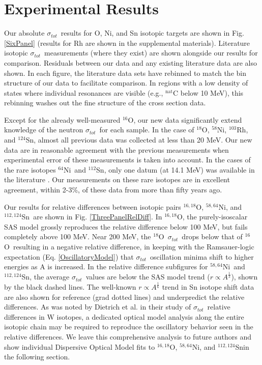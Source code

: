 \documentclass[twocolumn,secnumarabic,amssymb, nobibnotes, aps, prl,
superscriptaddress, nobalancelastpage]{revtex4}
\newcommand{\tot}{\ensuremath{\sigma_{tot}}}
\newcommand{\oSix}{\ensuremath{^{16}}O}
\newcommand{\oEight}{\ensuremath{^{18}}O}
\newcommand{\oSixEight}{\ensuremath{^{16,18}}O}
\newcommand{\niEight}{\ensuremath{^{58}}N\lowercase{i}}
\newcommand{\niFour}{\ensuremath{^{64}}N\lowercase{i}}
\newcommand{\niEightFour}{\ensuremath{^{58,64}}N\lowercase{i}}
\newcommand{\rhThree}{\ensuremath{^{103}}R\lowercase{h}}
\newcommand{\snTwelve}{\ensuremath{^{112}}S\lowercase{n}}
\newcommand{\snFour}{\ensuremath{^{124}}S\lowercase{n}}
\newcommand{\snTwelveFour}{\ensuremath{^{112,124}}S\lowercase{n}}
\begin{document}
\section{Experimental Results}

Our absolute \tot\ results for O, Ni, and Sn isotopic targets are shown in Fig.
\ref{SixPanel} (results for Rh are shown in the supplemental materials).
Literature isotopic \tot\ measurements
(where they exist) are shown alongside our results for comparison.
Residuals between our data and any existing literature data are also shown.
In each figure, the literature data sets have rebinned to match the bin
structure of our data to facilitate comparison. In regions with a low density of
states where individual resonances are visible (e.g., $^{\text{nat}}$C
below 10 MeV), this rebinning washes out the fine structure of the
cross section data.

Except for the already well-measured \oSix, our new data significantly
extend knowledge of the neutron \tot\ for each sample. In the case of \oEight,
\niEight, \rhThree, and \snFour, almost all previous data was collected at less 
than 20 MeV. Our new data are in reasonable agreement with the previous
measurements when experimental error of these measurements is taken into
account. In the cases of the rare isotopes \niFour\ and \snTwelve,
only one datum (at 14.1 MeV) was 
available in the literature \cite{Dukarevich1967}. Our measurements on these
rare isotopes are in excellent agreement, within 2-3\%, of these data from more
than fifty years ago.

Our results for relative differences between isotopic pairs \oSixEight,
\niEightFour, and \snTwelveFour\ are shown in Fig. \ref{ThreePanelRelDiff}. In
\oSixEight, the purely-isoscalar SAS model grossly reproduces the relative
difference below 100 MeV, but fails completely above 100 MeV. Near 200
MeV, the \oEight\ \tot\ drops below that of \oSix\ resulting in a negative
relative difference, in keeping with the Ramsauer-logic expectation (Eq.
\ref{OscillatoryModel}) that \tot\ oscillation minima shift to higher
energies as A is increased. In the relative difference subfigures for 
\niEightFour\ and \snTwelveFour, the average \tot\ values are below the
SAS model trend ($r \propto A^{\frac{1}{3}}$), shown by the black dashed lines. 
The well-known $r \propto A^{\frac{1}{6}}$ trend in Sn isotope shift data 
\cite{Anselment1986} are also shown for reference (grad dotted lines) and
underpredict the relative differences. As was noted by Dietrich et al. in
their study of \tot\ relative differences in W isotopes, a dedicated optical
model analysis along the entire isotopic chain may be required to
reproduce the oscillatory behavior seen in the relative differences. We leave
this comprehensive analysis to future authors and show individual Dispersive
Optical Model fits to \oSixEight, \niEightFour, and \snTwelveFour in the
following section.
\end{document}
